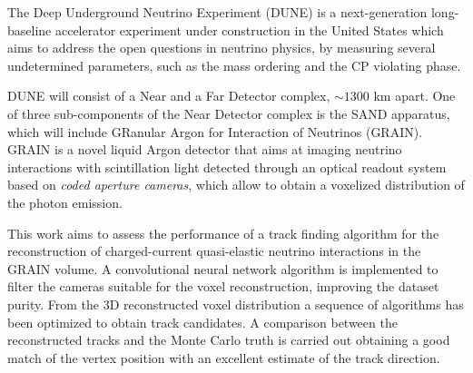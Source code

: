The Deep Underground Neutrino Experiment (DUNE) is a next-generation long-baseline accelerator experiment under construction in the United States which aims to address the open questions in neutrino physics, by measuring several undetermined parameters, such as the mass ordering and the CP violating phase. 

DUNE will consist of a Near and a Far Detector complex, $\sim 1300$ km apart. One of three sub-components of the Near Detector complex is the SAND apparatus, which will include GRanular Argon for Interaction of Neutrinos (GRAIN). GRAIN is a novel liquid Argon detector that aims at imaging neutrino interactions with scintillation light detected through an optical readout system based on \emph{coded aperture cameras}, which allow to obtain a voxelized distribution of the photon emission.

This work aims to assess the performance of a track finding algorithm for the reconstruction of charged-current quasi-elastic neutrino interactions in the GRAIN volume. A convolutional neural network algorithm is implemented to filter the cameras suitable for the voxel reconstruction, improving the dataset purity. From the 3D reconstructed voxel distribution a sequence of algorithms has been optimized to obtain track candidates. A comparison between the reconstructed tracks and the Monte Carlo truth is carried out obtaining a good match of the vertex position with an excellent estimate of the track direction. 